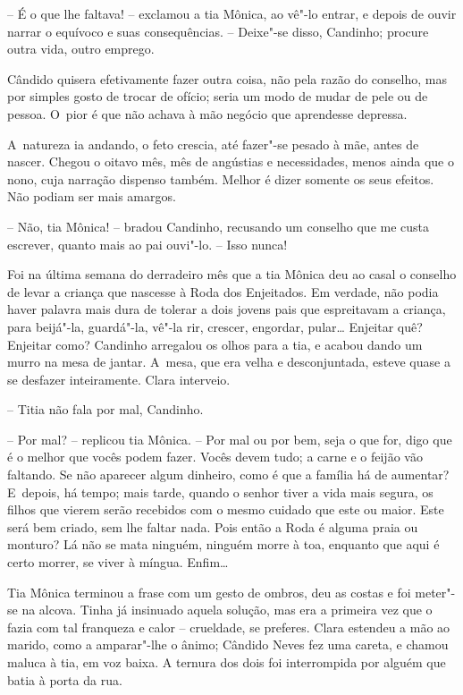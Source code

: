 -- É o que lhe faltava! -- exclamou a tia Mônica, ao vê"-lo entrar, e
depois de ouvir narrar o equívoco e suas consequências. -- Deixe"-se
disso, Candinho; procure outra vida, outro emprego.

Cândido quisera efetivamente fazer outra coisa, não pela razão do
conselho, mas por simples gosto de trocar de ofício; seria um modo de
mudar de pele ou de pessoa. O~pior é que não achava à mão negócio que
aprendesse depressa.

A~natureza ia andando, o feto crescia, até fazer"-se pesado à mãe, antes
de nascer. Chegou o oitavo mês, mês de angústias e necessidades, menos
ainda que o nono, cuja narração dispenso também. Melhor é dizer somente
os seus efeitos. Não podiam ser mais amargos.

-- Não, tia Mônica! -- bradou Candinho, recusando um conselho que me
custa escrever, quanto mais ao pai ouvi"-lo. -- Isso nunca!

Foi na última semana do derradeiro mês que a tia Mônica deu ao casal o
conselho de levar a criança que nascesse à Roda dos Enjeitados. Em
verdade, não podia haver palavra mais dura de tolerar a dois jovens pais
que espreitavam a criança, para beijá"-la, guardá"-la, vê"-la rir, crescer,
engordar, pular\ldots{} Enjeitar quê? Enjeitar como? Candinho arregalou os
olhos para a tia, e acabou dando um murro na mesa de jantar. A~mesa, que
era velha e desconjuntada, esteve quase a se desfazer inteiramente.
Clara interveio.

-- Titia não fala por mal, Candinho.

-- Por mal? -- replicou tia Mônica. -- Por mal ou por bem, seja o que
for, digo que é o melhor que vocês podem fazer. Vocês devem tudo; a
carne e o feijão vão faltando. Se não aparecer algum dinheiro, como é
que a família há de aumentar? E~depois, há tempo; mais tarde, quando o
senhor tiver a vida mais segura, os filhos que vierem serão recebidos
com o mesmo cuidado que este ou maior. Este será bem criado, sem lhe
faltar nada. Pois então a Roda é alguma praia ou monturo? Lá não se mata
ninguém, ninguém morre à toa, enquanto que aqui é certo morrer, se viver
à míngua. Enfim\ldots{}

Tia Mônica terminou a frase com um gesto de ombros, deu as costas e foi
meter"-se na alcova. Tinha já insinuado aquela solução, mas era a
primeira vez que o fazia com tal franqueza e calor -- crueldade, se
preferes. Clara estendeu a mão ao marido, como a amparar"-lhe o ânimo;
Cândido Neves fez uma careta, e chamou maluca à tia, em voz baixa. A
ternura dos dois foi interrompida por alguém que batia à porta da rua.

